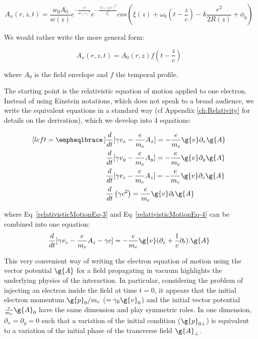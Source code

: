\begin{equation}
\label{eq:VectorPotentialGaussian}
A_x(r,z,t) = \frac{w_0 A_0}{w(z)}e^{-\frac{r^2}{w(z)^2}}e^{-\frac{(t-z/c)^2}{t_0^2}}cos(\xi(z) +\omega_0(t - \frac{z}{c}) - k\frac{r^2}{2R(z)}+\phi_0)
\end{equation}

\noindent We would rather write the more general form:

\begin{equation}
\label{eq:VectorPotentialGaussian2}
A_x(r,z,t) = A_0(r,z)f(t-\frac{z}{c})
\end{equation}

\noindent  where $A_{0}$ is the field envelope and $f$ the temporal profile.

\noindent The starting point is the relativistic equation of motion applied to one electron. Instead of using Einstein notations, which does not speak to a broad audience, we write the equivalent equations in a standard way (cf Appendix \ref{ch:Relativity} for details on the derivation), which we develop into 4 equations:

\begin{subequations}
\label{relativisticMotionEq-pond}
\begin{align}[left = \empheqlbrace\,]
&\frac{d}{dt}[\gamma v_x - \frac{e}{m_e}A_x] =- \frac{e}{m_e}\g{v}\partial_x \g{A} \label{relativisticMotionEq-1} \\
&\frac{d}{dt}[\gamma v_y - \frac{e}{m_e}A_y] =- \frac{e}{m_e}\g{v}\partial_y \g{A} \label{relativisticMotionEq-2} \\
&\frac{d}{dt}[\gamma v_z - \frac{e}{m_e}A_z] =- \frac{e}{m_e}\g{v}\partial_z \g{A} \label{relativisticMotionEq-3} \\
&\frac{d}{dt}\left( \gamma c^2 \right) = \frac{e}{m_e}\g{v} \partial_t\g{A}  \label{relativisticMotionEq-4}
\end{align}
\end{subequations}

\noindent  where Eq~\ref{relativisticMotionEq-3} and Eq~\ref{relativisticMotionEq-4} can be combined into one equation:
\begin{equation}
\label{eq:longitudinal}
\frac{d}{dt}[\gamma v_z - \frac{e}{m_e}A_z-\gamma c] = -\frac{e}{m_e}\g{v} (\partial_z  + \frac{1}{c}\partial_t).\g{A}
\end{equation}


\noindent This very convenient way of writing the electron equation of motion using the vector potential $\g{A}$ for a field propagating in vacuum highlights the underlying physics of the interaction. In particular, considering the problem of injecting an electron inside the field at time $t=0$, it appears that the initial electron momentum $\g{p}_{0}/m_e$ ($=\gamma_0\g{v}_0$) and the initial vector potential $\frac{e}{m_e}\g{A}_0$ have the same dimension and play symmetric roles. In one dimension, $\partial_x = \partial_y =0$ such that a variation of the initial condition ($\g{p}_{0\perp}$) is equivalent to a variation of the initial phase of the transverse field $\g{A}_{\perp}$. \\


